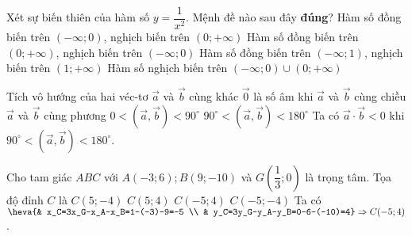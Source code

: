 \begin{ex}%
    Xét sự biến thiên của hàm số $ y=\dfrac{1}{x^2}$. Mệnh đề nào sau đây \textbf{đúng}?
    \choice
    {\True Hàm số đồng biến trên $(-\infty ;0)$, nghịch biến trên $(0;+\infty)$}
    {Hàm số đồng biến trên $(0;+\infty)$, nghịch biến trên $(-\infty ;0)$}
    {Hàm số đồng biến trên $(-\infty ;1)$, nghịch biến trên $(1;+\infty)$}
    {Hàm số nghịch biến trên $(-\infty ;0)\cup(0;+\infty)$}
\end{ex}
\begin{ex}%
    Tích vô hướng của hai véc-tơ $\vec{a}$ và $\vec{b}$ cùng khác $\overrightarrow{0}$ là số âm khi
    \choice
    {$\vec{a}$ và $\vec{b}$ cùng chiều}
    {$\vec{a}$ và $\vec{b}$ cùng phương}
    {$0<(\vec{a}, \vec{b})<90^{\circ}$}
    {\True $90^\circ<(\vec{a}, \vec{b})<180^{\circ}$} 
    \loigiai
    {
         Ta có $\vec{a}\cdot\vec{b}<0$ khi $90^\circ<(\vec{a}, \vec{b})<180^{\circ}$.
    }
\end{ex}
\begin{ex}%
    Cho tam giác $A B C$ với $A(-3 ; 6) ; B(9 ;-10)$ và $G\left(\dfrac{1}{3} ; 0\right)$ là trọng tâm. Tọa độ đỉnh $C$ là
    \choice
    { $C(5 ;-4)$}
    {$C(5 ; 4)$}
    {\True $C(-5 ; 4)$}
    {$C(-5 ;-4)$} 
    \loigiai
    {
        Ta có $\heva{& x_C=3x_G-x_A-x_B=1-(-3)-9=-5 \\ &  y_C=3y_G-y_A-y_B=0-6-(-10)=4}\Rightarrow C(-5 ; 4)$.
    }
\end{ex}
